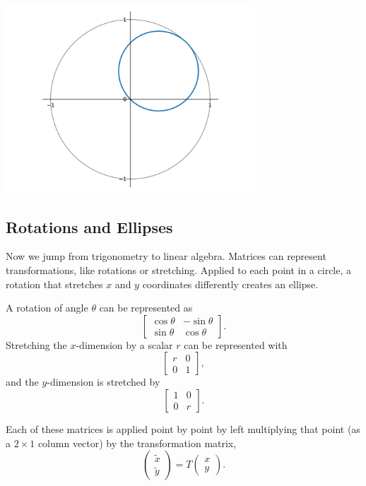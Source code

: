 
\begin{center}
    \includegraphics[width = 0.7\textwidth]{figures/mathplots/unit-circle-shift.pdf}
\end{center}

\subsection{Rotations and Ellipses}\label{subsec:rotations}

Now we jump from trigonometry to linear algebra. Matrices can represent transformations, like rotations or stretching. Applied to each point in a circle, a rotation that stretches $x$ and $y$ coordinates differently creates an ellipse.

A rotation of angle $\theta$ can be represented as
$$\left[ \begin{array}{cc}
    \cos \theta & -\sin \theta \\
    \sin \theta & \cos \theta
\end{array} \right].$$ Stretching the $x$-dimension by a scalar $r$ can be represented with
$$ \left[ \begin{array}{cc}
    r & 0 \\
    0 & 1 
\end{array} \right],$$ and the $y$-dimension is stretched by
$$ \left[ \begin{array}{cc}
    1 & 0 \\
    0 & r 
\end{array} \right].$$

Each of these matrices is applied point by point by left multiplying that point (as a $2\times 1$ column vector) by the transformation matrix,
$$ \begin{pmatrix}
     \tilde{x}  \\
     \tilde{y}
\end{pmatrix} = T \begin{pmatrix}
     x  \\
     y
\end{pmatrix}.$$



